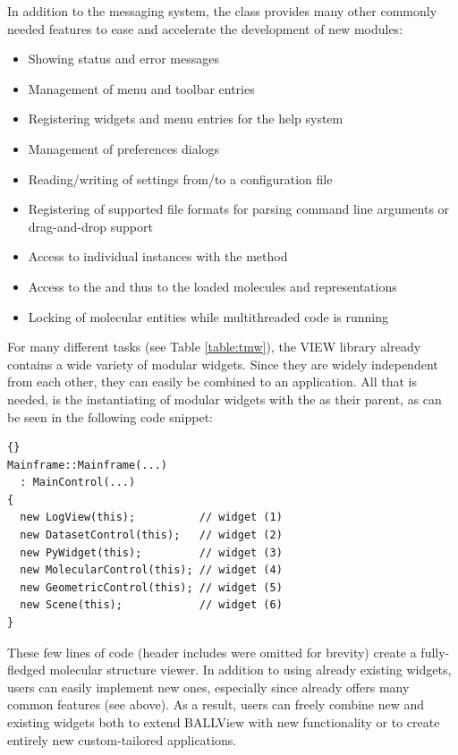 In addition to the messaging system, the  class provides 
many other commonly needed features to ease and accelerate the development of
new modules:
\begin{itemize}
  \item Showing status and error messages
  \item Management of menu and toolbar entries 
  \item Registering widgets and menu entries for the help system
  \item Management of preferences dialogs
  \item Reading/writing of settings from/to a configuration file
  \item Registering of supported file formats \eg for parsing command line
        arguments or drag-and-drop support
  \item Access to individual instances with the method 
  \item Access to the  and thus to the loaded molecules 
        and representations
  \item Locking of molecular entities while multithreaded code is running
\end{itemize}

For many different tasks (see Table \ref{table:tmw}), the VIEW library already 
contains a wide variety of modular widgets. Since they are widely independent 
from each other, they can easily be combined to an application. All that is 
needed, is the instantiating of modular widgets with the  
as their parent, as can be seen in the following code snippet:

\begin{lstlisting}{}
Mainframe::Mainframe(...)
  : MainControl(...)
{
  new LogView(this);          // widget (1)
  new DatasetControl(this);   // widget (2)
  new PyWidget(this);         // widget (3)
  new MolecularControl(this); // widget (4)
  new GeometricControl(this); // widget (5)
  new Scene(this);            // widget (6)
}
\end{lstlisting}

\noindent
These few lines of code (header includes were omitted for brevity) create a 
fully-fledged molecular structure viewer. In addition to using already 
existing widgets, users can easily implement new ones, especially since 
 already offers many common features (see above). As a 
result, users can freely combine new and existing widgets both to extend 
\mbox{BALLView} with new functionality or to create entirely new 
custom-tailored applications.

